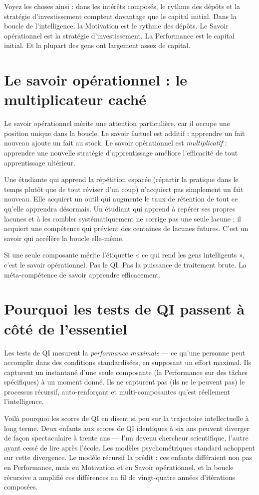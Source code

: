 \documentclass[11pt, twoside, openright]{book}
\begin{document}
Voyez les choses ainsi : dans les intérêts composés, le rythme des dépôts et la stratégie d'investissement comptent davantage que le capital initial. Dans la boucle de l'intelligence, la Motivation est le rythme des dépôts. Le Savoir opérationnel est la stratégie d'investissement. La Performance est le capital initial. Et la plupart des gens ont largement assez de capital.

\section*{Le savoir opérationnel : le multiplicateur caché}

Le savoir opérationnel mérite une attention particulière, car il occupe une position unique dans la boucle. Le savoir factuel est additif : apprendre un fait nouveau ajoute un fait au stock. Le savoir opérationnel est \textit{multiplicatif} : apprendre une nouvelle stratégie d'apprentissage améliore l'efficacité de tout apprentissage ultérieur.

Une étudiante qui apprend la répétition espacée (répartir la pratique dans le temps plutôt que de tout réviser d'un coup) n'acquiert pas simplement un fait nouveau. Elle acquiert un outil qui augmente le taux de rétention de tout ce qu'elle apprendra désormais. Un étudiant qui apprend à repérer ses propres lacunes et à les combler systématiquement ne corrige pas une seule lacune ; il acquiert une compétence qui prévient des centaines de lacunes futures. C'est un savoir qui accélère la boucle elle-même.

Si une seule composante mérite l'étiquette « ce qui rend les gens intelligents », c'est le savoir opérationnel. Pas le QI. Pas la puissance de traitement brute. La méta-compétence de savoir apprendre efficacement.

\section*{Pourquoi les tests de QI passent à côté de l'essentiel}

Les tests de QI mesurent la \textit{performance maximale} --- ce qu'une personne peut accomplir dans des conditions standardisées, en supposant un effort maximal. Ils capturent un instantané d'une seule composante (la Performance sur des tâches spécifiques) à un moment donné. Ils ne capturent pas (ils ne le peuvent pas) le processus récursif, auto-renforçant et multi-composantes qu'est réellement l'intelligence.

Voilà pourquoi les scores de QI en disent si peu sur la trajectoire intellectuelle à long terme. Deux enfants aux scores de QI identiques à six ans peuvent diverger de façon spectaculaire à trente ans --- l'un devenu chercheur scientifique, l'autre ayant cessé de lire après l'école. Les modèles psychométriques standard achoppent sur cette divergence. Le modèle récursif la prédit : ces enfants différaient non pas en Performance, mais en Motivation et en Savoir opérationnel, et la boucle récursive a amplifié ces différences au fil de vingt-quatre années d'itérations composées.
\end{document}
